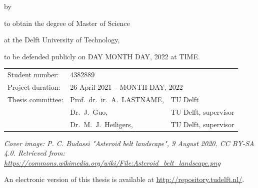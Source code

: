 \begin{titlepage}


\begin{center}


{\makeatletter
\largetitlestyle\fontsize{36}{48}\selectfont\@title
\makeatother}

{\makeatletter
\ifx\@subtitle\undefined\else
    \bigskip
   {\tudsffamily\fontsize{22}{32}\selectfont\@subtitle}    
\fi
\makeatother}

\bigskip
\bigskip

by

\bigskip
\bigskip

{\makeatletter
\largetitlestyle\fontsize{26}{26}\selectfont\@author
\makeatother}

\bigskip
\bigskip

to obtain the degree of Master of Science

at the Delft University of Technology,

to be defended publicly on DAY MONTH DAY, 2022 at TIME.

\vfill

\begin{tabular}{lll}
    Student number: & 4382889 \\
    Project duration: & \multicolumn{2}{l}{26 April 2021 -- MONTH DAY, 2022} \\
    Thesis committee: & Prof.\ dr.\ ir.\ A.\ LASTNAME, & TU Delft \\
        & Dr.\ J.\ Guo, & TU Delft, supervisor \\
        & Dr.\ M.\ J.\ Heiligers, & TU Delft, supervisor
\end{tabular}

\bigskip
\bigskip
\emph{Cover image: P. C. Budassi "Asteroid belt landscape", 9 August 2020, CC BY-SA 4.0. Retrieved from: \url{https://commons.wikimedia.org/wiki/File:Asteroid_belt_landscape.png}}

\bigskip
\bigskip
An electronic version of this thesis is available at \url{http://repository.tudelft.nl/}.


\end{center}
\end{titlepage}
